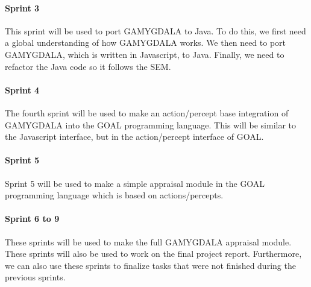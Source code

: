 \paragraph{Sprint 3} This sprint will be used to port \gls{GAMYGDALA} to Java. To do this, we first need a global understanding of how \gls{GAMYGDALA} works. We then need to port \gls{GAMYGDALA}, which is written in Javascript, to Java. Finally, we need to refactor the Java code so it follows the \gls{SEM}.
\paragraph{Sprint 4} The fourth sprint will be used to make an action/percept base integration of \gls{GAMYGDALA} into the \gls{GOAL} programming language. This will be similar to the Javascript interface, but in the action/percept interface of \gls{GOAL}.
\paragraph{Sprint 5} Sprint 5 will be used to make a simple appraisal module in the \gls{GOAL} programming language which is based on actions/percepts.
\paragraph{Sprint 6 to 9} These sprints will be used to make the full \gls{GAMYGDALA} appraisal module. These sprints will also be used to work on the final project report. Furthermore, we can also use these sprints to finalize tasks that were not finished during the previous sprints.
